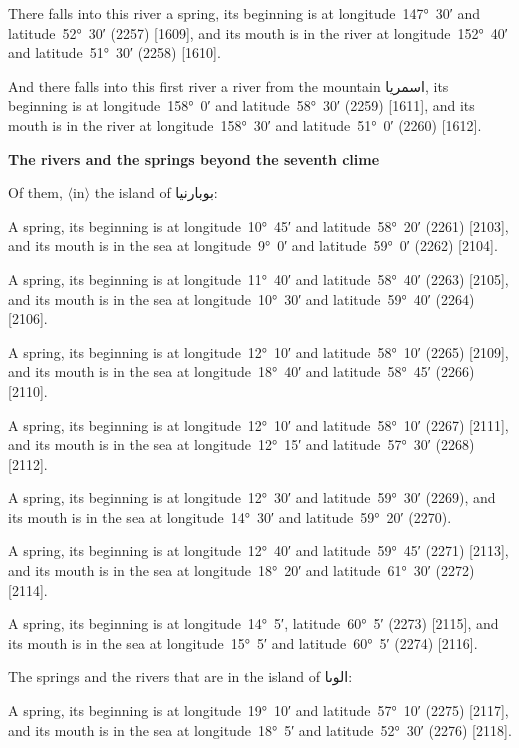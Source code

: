 \documentclass[11pt]{article}
\newcommand{\Pg}[1]{\marginpar{\footnotesize #1}}
\newcommand{\Ang}[1]{\ensuremath{#1}}
\begin{document}
There falls into this river a spring, its beginning is at longitude~147°~30′ and latitude~52°~30′ (2257) [1609], and its mouth is in the river at longitude~152°~40′ and latitude~51°~30′ (2258) [1610].

And there falls into this first river a river from the mountain \textarabic{اسمريا}, its beginning is at longitude~158°~0′ and latitude~58°~30′ (2259) [1611], and its mouth is in the river at longitude~158°~30′ and latitude~51°~0′ (2260) [1612].

\par\medskip\begin{center}\bfseries The rivers and the springs beyond the seventh clime\end{center}\par

Of them, \Ang{\langle}in\Ang{\rangle} the island of \textarabic{بوبارنيا}:

A spring, its beginning is at longitude~10°~45′ and latitude~58°~20′ (2261) [2103], and its mouth is in the sea at longitude~9°~0′ and latitude~59°~0′ (2262) [2104].

A spring, its beginning is at longitude~11°~40′ and latitude~58°~40′ (2263) [2105], and its mouth is in the sea at longitude~10°~30′ and latitude~59°~40′ (2264) [2106].

A spring, its beginning is at longitude~12°~10′ and latitude~58°~10′ (2265) [2109]\Pg{p. 150}, and its mouth is in the sea at longitude~18°~40′ and latitude~58°~45′ (2266) [2110].

A spring, its beginning is at longitude~12°~10′ and latitude~58°~10′ (2267) [2111], and its mouth is in the sea at longitude~12°~15′ and latitude~57°~30′ (2268) [2112].

A spring, its beginning is at longitude~12°~30′ and latitude~59°~30′ (2269), and its mouth is in the sea at longitude~14°~30′ and latitude~59°~20′ (2270).

A spring, its beginning is at longitude~12°~40′ and latitude~59°~45′ (2271) [2113], and its mouth is in the sea at longitude~18°~20′ and latitude~61°~30′ (2272) [2114].

A spring, its beginning is at longitude~14°~5′, latitude~60°~5′ (2273) [2115], and its mouth is in the sea at longitude~15°~5′ and latitude~60°~5′ (2274) [2116].

The springs and the rivers that are in the island of \textarabic{الوٮا}:

A spring, its beginning is at longitude~19°~10′ and latitude~57°~10′ (2275) [2117], and its mouth is in the sea at longitude~18°~5′ and latitude~52°~30′ (2276) [2118].
\end{document}
